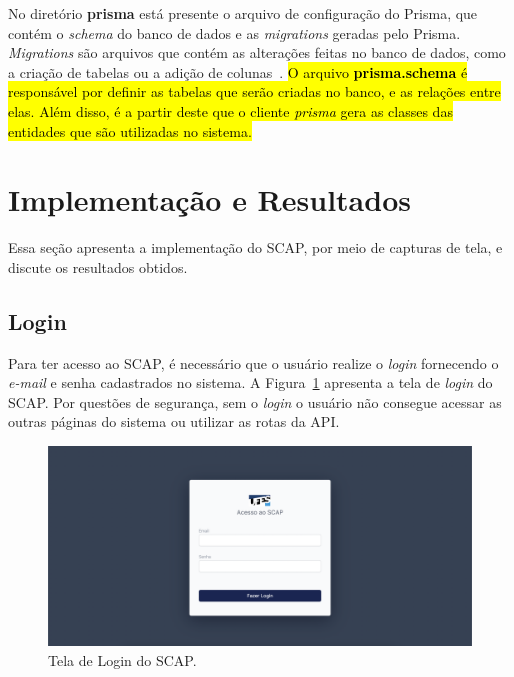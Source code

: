 No diretório \textbf{prisma} está presente o arquivo de configuração do Prisma, que contém o \textit{schema} do banco de dados e as \textit{migrations}
geradas pelo Prisma. \textit{Migrations} são arquivos que contém as alterações feitas no banco de dados, como a criação de tabelas ou a adição de colunas~\cite{prisma:2020}.
\hl{O arquivo \textbf{prisma.schema} é responsável por definir as tabelas que serão criadas no banco, e as relações entre elas. Além disso, é a partir deste que 
o cliente \textit{prisma} gera as classes das entidades que são utilizadas no sistema.}


\FloatBarrier


\section{Implementação e Resultados}
\label{sec-projeto-impl}

Essa seção apresenta a implementação do SCAP, por meio de capturas de tela,
e discute os resultados obtidos.

\subsection{Login}
\label{subsec-projeto-login}

Para ter acesso ao SCAP, é necessário que o usuário realize o \textit{login} fornecendo o \textit{e-mail}
e senha cadastrados no sistema. A Figura~\ref{fig-login} apresenta a tela de \textit{login} do SCAP.
Por questões de segurança, sem o \textit{login} o usuário não consegue acessar as outras páginas do sistema
ou utilizar as rotas da API.

\begin{figure}[h!]
    \centering
    \includegraphics[width=\textwidth]{figuras/prints-app/fig-login.png}
    \caption{Tela de Login do SCAP.}
    \label{fig-login}
\end{figure}

